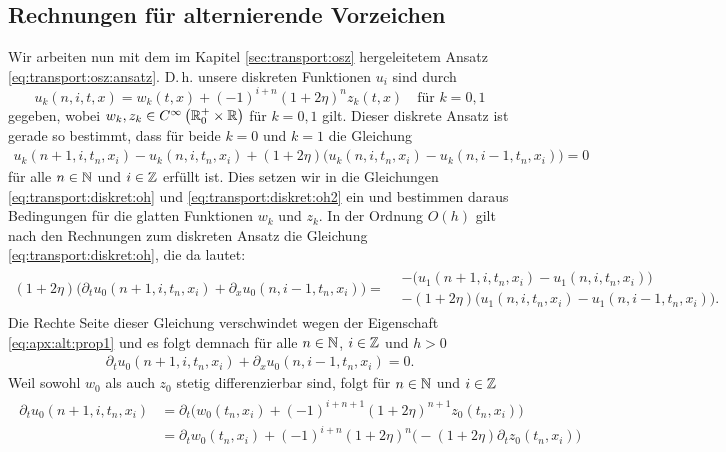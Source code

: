 \subsection{Rechnungen für alternierende Vorzeichen}
\label{appendix:osz:sortiere_nach_frequenz}
Wir arbeiten nun mit dem im Kapitel \ref{sec:transport:osz} hergeleitetem Ansatz \eqref{eq:transport:osz:ansatz}. 
D.\,h. unsere diskreten Funktionen $u_i$ sind durch
\[ u_k(n, i, t, x) = w_k(t, x) + (-1)^{i+n} (1 + 2\eta)^n z_k(t, x) \quad \text{für $k = 0,1$} \]
gegeben, wobei $w_k, z_k \in C^{\infty}\left( \mathbb R^+_0 \times \mathbb R \right)$ für $k=0, 1$ gilt.
Dieser diskrete Ansatz ist gerade so bestimmt, dass für beide $k=0$ und $k=1$ die Gleichung
\begin{align}\label{eq:apx:alt:prop1}
u_k(n+1, i, t_n, x_i) - u_k(n, i, t_n, x_i) + (1 + 2\eta)\bigl(u_k(n, i, t_n, x_i) - u_k(n, i-1, t_n, x_i) \bigr) = 0
\end{align}
für alle $n \in \mathbb N$ und $i \in \mathbb Z$ erfüllt ist.
Dies setzen wir in die Gleichungen \eqref{eq:transport:diskret:oh} und \eqref{eq:transport:diskret:oh2} ein und bestimmen daraus Bedingungen für die glatten Funktionen $w_k$ und $z_k$. 
In der Ordnung $O(h)$ gilt nach den Rechnungen zum diskreten Ansatz die Gleichung \eqref{eq:transport:diskret:oh}, die da lautet:
\begin{align*}
(1 + 2\eta) \bigl( \partial_t u_0(n+1, i, t_n, x_i) + \partial_x u_0(n, i-1, t_n, x_i) \bigr) =
\begin{split}
&- \bigl( u_1(n+1, i, t_n, x_i) - u_1(n, i, t_n, x_i) \bigr)\\
&- (1 + 2 \eta) \bigl(u_1(n, i, t_n, x_i) - u_1(n, i-1, t_n, x_i) \bigr).
\end{split}
\end{align*}
Die Rechte Seite dieser Gleichung verschwindet wegen der Eigenschaft \eqref{eq:apx:alt:prop1} und es folgt demnach für alle $n \in \mathbb N$, $i \in \mathbb Z$ und $h > 0$
\begin{align*}
\partial_t u_0(n+1, i, t_n, x_i) + \partial_x u_0(n, i-1, t_n, x_i) = 0.
\end{align*}
Weil sowohl $w_0$ als auch $z_0$ stetig differenzierbar sind, folgt für $n \in \mathbb N$ und $i \in \mathbb Z$
\begin{align}
\begin{split}
\partial_t u_0(n+1, i, t_n, x_i) &= \partial_t \bigl( w_0(t_n, x_i) + (-1)^{i+n+1} (1 + 2\eta)^{n+1} z_0(t_n, x_i) \bigr)\\
&= \partial_t w_0(t_n, x_i) + (-1)^{i+n} (1 + 2\eta)^n \bigl( - (1 + 2 \eta) \partial_t z_0(t_n, x_i) \bigr)
\end{split}
\end{align}
